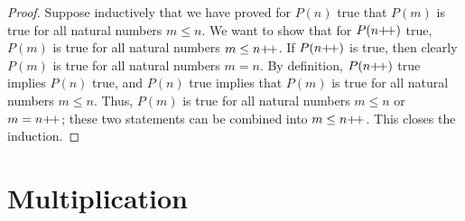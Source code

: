 \documentclass[../main.tex]{subfiles}
\begin{document}
\begin{enumerate}[ref={\thesection.\arabic*}]
\begin{proof}
        Suppose inductively that we have proved for $P(n)$ true that $P(m)$ is true for all natural numbers $m\leq n$. We want to show that for $P(n{+\!+})$ true, $P(m)$ is true for all natural numbers $m\leq n{+\!+}$. If $P(n{+\!+})$ is true, then clearly $P(m)$ is true for all natural numbers $m=n$. By definition, $P(n{+\!+})$ true implies $P(n)$ true, and $P(n)$ true implies that $P(m)$ is true for all natural numbers $m\leq n$. Thus, $P(m)$ is true for all natural numbers $m\leq n$ or $m=n{+\!+}$; these two statements can be combined into $m\leq n{+\!+}$. This closes the induction.
    \end{proof}
\end{enumerate}



\section{Multiplication}
\end{document}
